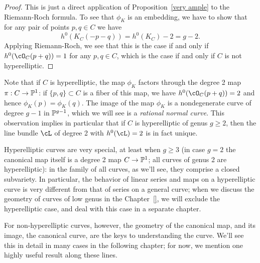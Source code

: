 \begin{proof}
This is just a direct application of Proposition~\ref{very ample} to the Riemann-Roch formula. To see that $\phi_K$ is an embedding, we have to show that for any pair of points $p, q \in C$ we have
$$
h^0(K_C(-p-q)) = h^0(K_C)-2 = g-2.
$$
Applying Riemann-Roch, we see that this is the case if and only if $h^0(\cO_C(p+q)) = 1$ for any $p,q \in C$, which is the case if and only if $C$ is not hyperelliptic.
\end{proof}

Note that if $C$ is hyperelliptic, the map $\phi_K$ factors through the degree 2 map $\pi : C \to \PP^1$: if $\{p,q\} \subset C$ is a fiber of this map, we have $h^0(\cO_C(p+q)) = 2$ and hence $\phi_K(p) = \phi_K(q)$. The image of the map $\phi_K$ is a nondegenerate curve of degree $g-1$ in $\PP^{g-1}$, which we will see is a \emph{rational normal curve}. This observation implies in particular that if $C$ is hyperelliptic of genus $g \geq 2$, then the line bundle $\cL$ of degree 2 with $h^0(\cL) = 2$ is in fact unique.

Hyperelliptic curves are very special, at least when $g \geq 3$ (in case $g=2$ the canonical map itself is a degree 2 map $C \to \PP^1$; all curves of genus 2 are hyperelliptic): in the family of all curves, as we'll see, they comprise a closed subvariety. In particular, the behavior of linear series and maps on a hyperelliptic curve is very different from that of series on a general curve; when we discuss the geometry of curves of low genus in the Chapter~\ref{}, we will exclude  the hyperelliptic case, and deal with this case in a separate chapter.

For non-hyperelliptic curves, however, the geometry of the canonical map, and its image, the canonical curve, are the keys to understanding the curve. We'll see this in detail in many cases in the following chapter; for now, we mention one highly useful result along these lines.




